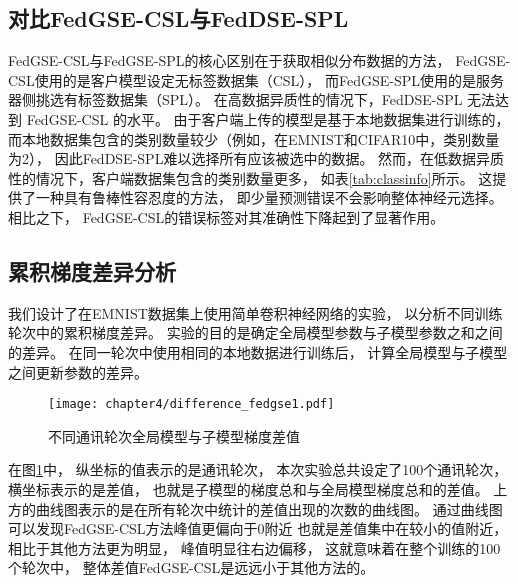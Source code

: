 \subsection{对比FedGSE-CSL与FedDSE-SPL}
FedGSE-CSL与FedGSE-SPL的核心区别在于获取相似分布数据的方法，
FedGSE-CSL使用的是客户模型设定无标签数据集（CSL），
而FedGSE-SPL使用的是服务器侧挑选有标签数据集（SPL）。
在高数据异质性的情况下，FedDSE-SPL 无法达到 FedGSE-CSL 的水平。
由于客户端上传的模型是基于本地数据集进行训练的，
而本地数据集包含的类别数量较少（例如，在EMNIST和CIFAR10中，类别数量为2），
因此FedDSE-SPL难以选择所有应该被选中的数据。
然而，在低数据异质性的情况下，客户端数据集包含的类别数量更多，
如表\ref{tab:classinfo}所示。
这提供了一种具有鲁棒性容忍度的方法，
即少量预测错误不会影响整体神经元选择。
相比之下，
FedGSE-CSL的错误标签对其准确性下降起到了显著作用。

\subsection{累积梯度差异分析}
我们设计了在EMNIST数据集上使用简单卷积神经网络的实验，
以分析不同训练轮次中的累积梯度差异。
实验的目的是确定全局模型参数与子模型参数之和之间的差异。
在同一轮次中使用相同的本地数据进行训练后，
计算全局模型与子模型之间更新参数的差异。
\begin{figure}[thbp]
    \centering
    \texttt{[image: chapter4/difference\_fedgse1.pdf]}
    \caption{\label{fig:4-4fedgse_difference}不同通讯轮次全局模型与子模型梯度差值}
\end{figure}
在图\ref{fig:4-4fedgse_difference}中，
纵坐标的值表示的是通讯轮次，
本次实验总共设定了100个通讯轮次，
横坐标表示的是差值，
也就是子模型的梯度总和与全局模型梯度总和的差值。
上方的曲线图表示的是在所有轮次中统计的差值出现的次数的曲线图。
通过曲线图可以发现FedGSE-CSL方法峰值更偏向于0附近
也就是差值集中在较小的值附近，
相比于其他方法更为明显，
峰值明显往右边偏移，
这就意味着在整个训练的100个轮次中，
整体差值FedGSE-CSL是远远小于其他方法的。



